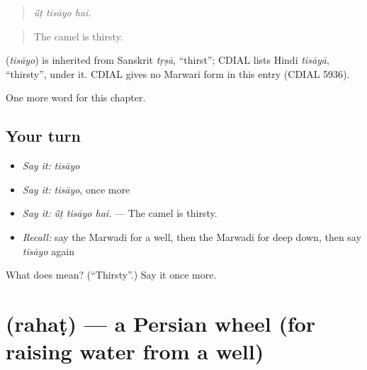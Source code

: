 \begin{quote}
  
\end{quote}

\begin{quote}
\emph{ū̃ṭ tisāyo hai.}
\end{quote}

\begin{quote}
The camel is thirsty.
\end{quote}

\begin{cousinweb}
\textbf{} (\emph{tisāyo}) is inherited from Sanskrit \emph{tṛṣā}, \textquotedblleft{}thirst\textquotedblright{}; CDIAL lists Hindi \emph{tisāyā}, \textquotedblleft{}thirsty\textquotedblright{}, under it. CDIAL gives no Marwari form in this entry (CDIAL 5936).
\end{cousinweb}

\begin{grammarlens}[title={What you've built}]
One more word for this chapter.
\end{grammarlens}

\subsection*{Your turn}
\begin{itemize}
\raggedright
  \item \emph{Say it:} \emph{tisāyo}
  \item \emph{Say it:} \emph{tisāyo}, once more
  \item \emph{Say it:} \emph{ū̃ṭ tisāyo hai.} — The camel is thirsty.
  \item \emph{Recall:} say the Marwadi for a well, then the Marwadi for deep down, then say \emph{tisāyo} again
\end{itemize}

\begin{tcolorbox}[breakable,colback=teal!4,colframe=teal!35!black,title={Before you move on}]
What does  mean? (\textquotedblleft{}Thirsty\textquotedblright{}.) Say it once more.
\end{tcolorbox}
\section[\texorpdfstring{\mw{रहट} (rahaṭ)}{रहट (rahaṭ)}]{ (rahaṭ) — a Persian wheel (for raising water from a well)}

\label{lesson:MW-C227-rahat}



